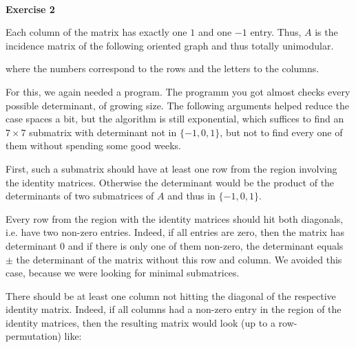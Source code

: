 \documentclass[12pt]{article}
\newenvironment{a_enum}{\begin{enumerate}[label=(\alph{*})]}{\end{enumerate}} %
\newenvironment{b_item}{\begin{itemize}}{\end{itemize}} %
\begin{document}
\ \\
{\bf Exercise 2}\begin{a_enum}\item Each column of the matrix has exactly one $1$ and one $-1$ entry. Thus, $A$ is the incidence matrix of the following oriented graph and thus totally unimodular.
\begin{center}
\end{center}
where the numbers correspond to the rows and the letters to the columns.
\item For this, we again needed a program. The programm you got almost checks every possible determinant, of growing size. The following arguments helped reduce the case spaces a bit, but the algorithm is still exponential, which suffices to find an $7\times 7$ submatrix with determinant not in $\{-1,0,1\}$, but not to find every one of them without spending some good weeks.
\begin{b_item} \item First, such a submatrix should have at least one row from the region involving the identity matrices. Otherwise the determinant would be the product of the determinants of two submatrices of $A$ and thus in $\{-1,0,1\}$.
\item Every row from the region with the identity matrices should hit both diagonals, i.e. have two non-zero entries. Indeed, if all entries are zero, then the matrix has determinant $0$ and if there is only one of them non-zero, the determinant equals $\pm$ the determinant of the matrix without this row and column. We avoided this case, because we were looking for minimal submatrices.
\item There should be at least one column not hitting the diagonal of the respective identity matrix. Indeed, if all columns had a non-zero entry in the region of the identity matrices, then the resulting matrix would look (up to a row-permutation) like:

\end{b_item}
\end{a_enum}
\end{document}
